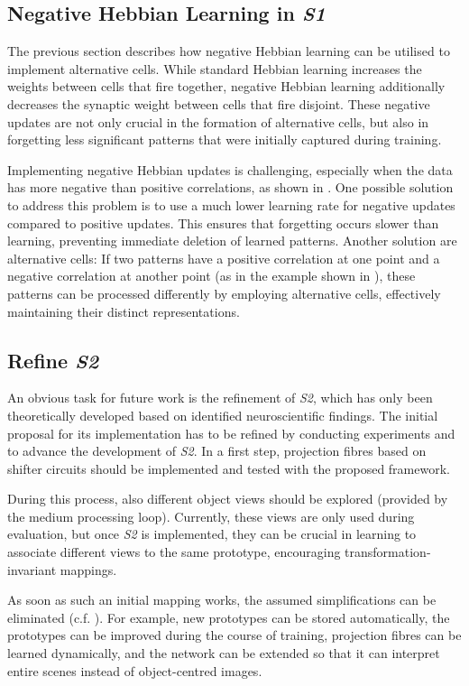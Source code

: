 \subsection{Negative Hebbian Learning in \emph{S1}}
The previous section describes how negative Hebbian learning can be utilised to implement alternative cells.
While standard Hebbian learning increases the weights between cells that fire together, negative Hebbian learning additionally decreases the synaptic weight between cells that fire disjoint.
These negative updates are not only crucial in the formation of alternative cells, but also in forgetting less significant patterns that were initially captured during training.

Implementing negative Hebbian updates is challenging, especially when the data has more negative than positive correlations, as shown in .
One possible solution to address this problem is to use a much lower learning rate for negative updates compared to positive updates. This ensures that forgetting occurs slower than learning, preventing immediate deletion of learned patterns.
Another solution are alternative cells: If two patterns have a positive correlation at one point and a negative correlation at another point (as in the example shown in ), these patterns can be processed differently by employing alternative cells, effectively maintaining their distinct representations.


\subsection{Refine \emph{S2}}
An obvious task for future work is the refinement of \emph{S2}, which has only been theoretically developed based on identified neuroscientific findings. The initial proposal for its implementation has to be refined by conducting experiments and to advance the development of \emph{S2}.
In a first step, projection fibres based on shifter circuits  should be implemented and tested with the proposed framework.

During this process, also different object views should be explored (provided by the medium processing loop). Currently, these views are only used during evaluation, but once \emph{S2} is implemented, they can be crucial in learning to associate different views to the same prototype, encouraging transformation-invariant mappings.

As soon as such an initial mapping works, the assumed simplifications can be eliminated (c.f. ). For example, new prototypes can be stored automatically, the prototypes can be improved during the course of training, projection fibres can be learned dynamically, and the network can be extended so that it can interpret entire scenes instead of object-centred images.

